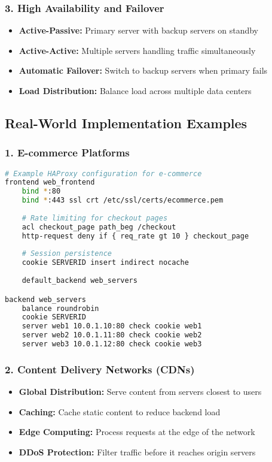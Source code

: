 \documentclass[12pt]{article}
\begin{document}
\subsubsection{3. High Availability and Failover}
\begin{itemize}
    \item \textbf{Active-Passive:} Primary server with backup servers on standby
    \item \textbf{Active-Active:} Multiple servers handling traffic simultaneously
    \item \textbf{Automatic Failover:} Switch to backup servers when primary fails
    \item \textbf{Load Distribution:} Balance load across multiple data centers
\end{itemize}

\subsection{Real-World Implementation Examples}

\subsubsection{1. E-commerce Platforms}
\begin{lstlisting}[language=bash, caption=Typical E-commerce Load Balancer Configuration]
# Example HAProxy configuration for e-commerce
frontend web_frontend
    bind *:80
    bind *:443 ssl crt /etc/ssl/certs/ecommerce.pem
    
    # Rate limiting for checkout pages
    acl checkout_page path_beg /checkout
    http-request deny if { req_rate gt 10 } checkout_page
    
    # Session persistence
    cookie SERVERID insert indirect nocache
    
    default_backend web_servers

backend web_servers
    balance roundrobin
    cookie SERVERID
    server web1 10.0.1.10:80 check cookie web1
    server web2 10.0.1.11:80 check cookie web2
    server web3 10.0.1.12:80 check cookie web3
\end{lstlisting}

\subsubsection{2. Content Delivery Networks (CDNs)}
\begin{itemize}
    \item \textbf{Global Distribution:} Serve content from servers closest to users
    \item \textbf{Caching:} Cache static content to reduce backend load
    \item \textbf{Edge Computing:} Process requests at the edge of the network
    \item \textbf{DDoS Protection:} Filter traffic before it reaches origin servers
\end{itemize}
\end{document}
